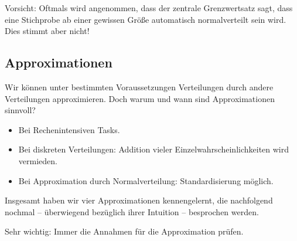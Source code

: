 \documentclass[a4paper]{article}
\newcommand\dangersign[1][2ex]{%
  \renewcommand\stacktype{L}%
  \scaleto{\stackon[1.3pt]{\color{red}$\triangle$}{\tiny !}}{#1}%
}
\begin{document}
\noindent \dangersign[3ex] Vorsicht: Oftmals wird angenommen, dass der zentrale Grenzwertsatz sagt, dass eine Stichprobe ab einer gewissen Größe automatisch normalverteilt sein wird. Dies stimmt aber nicht!


\subsection{Approximationen}\label{sec:Approx}
Wir können unter bestimmten Voraussetzungen Verteilungen durch andere Verteilungen approximieren. Doch warum und wann sind Approximationen sinnvoll?

\begin{itemize}
    \item Bei Rechenintensiven Tasks.
    \item Bei  diskreten Verteilungen: Addition vieler Einzelwahrscheinlichkeiten wird vermieden.
    \item Bei Approximation durch Normalverteilung: Standardisierung möglich.
\end{itemize}

\noindent Insgesamt haben wir vier Approximationen kennengelernt, die nachfolgend nochmal -- überwiegend bezüglich ihrer Intuition -- besprochen werden.

\noindent \dangersign[3ex] Sehr wichtig: Immer die Annahmen für die Approximation prüfen.
\end{document}
